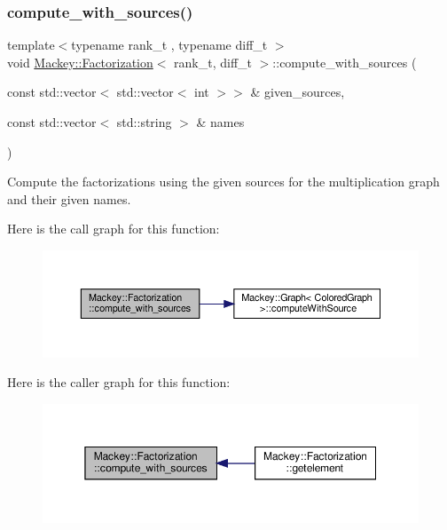\subsubsection{\texorpdfstring{compute\+\_\+with\+\_\+sources()}{compute\_with\_sources()}}
{\footnotesize\ttfamily template$<$typename rank\+\_\+t , typename diff\+\_\+t $>$ \\
void \hyperlink{classMackey_1_1Factorization}{Mackey\+::\+Factorization}$<$ rank\+\_\+t, diff\+\_\+t $>$\+::compute\+\_\+with\+\_\+sources (\begin{DoxyParamCaption}\item[{const std\+::vector$<$ std\+::vector$<$ int $>$$>$ \&}]{given\+\_\+sources,  }\item[{const std\+::vector$<$ std\+::string $>$ \&}]{names }\end{DoxyParamCaption})}



Compute the factorizations using the given sources for the multiplication graph and their given names. 

Here is the call graph for this function\+:\nopagebreak
\begin{figure}[H]
\begin{center}
\leavevmode
\includegraphics[width=350pt]{classMackey_1_1Factorization_a2e135a37687fc3d69cd16a8729dd19eb_cgraph}
\end{center}
\end{figure}
Here is the caller graph for this function\+:\nopagebreak
\begin{figure}[H]
\begin{center}
\leavevmode
\includegraphics[width=350pt]{classMackey_1_1Factorization_a2e135a37687fc3d69cd16a8729dd19eb_icgraph}
\end{center}
\end{figure}
\mbox{\label{classMackey_1_1Factorization_a273e9318c0a5eacacd584474f93ffe4a}} 
